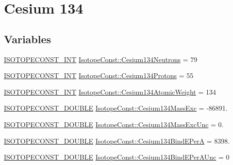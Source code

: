 \hypertarget{group___isotope_const-_cesium-_cs134}{}\section{Cesium 134}
\label{group___isotope_const-_cesium-_cs134}
\subsection*{Variables}
\begin{DoxyCompactItemize}
\item 
\mbox{\hyperlink{group___isotope_const-_macros_ga5f18360b3e99483a35c32d789e62621c}{I\+S\+O\+T\+O\+P\+E\+C\+O\+N\+S\+T\+\_\+\+I\+NT}} \mbox{\hyperlink{group___isotope_const-_cesium-_cs134_gae3ab79e8625c3c9ac06b12de8f676618}{Isotope\+Const\+::\+Cesium134\+Neutrons}} = 79
\item 
\mbox{\hyperlink{group___isotope_const-_macros_ga5f18360b3e99483a35c32d789e62621c}{I\+S\+O\+T\+O\+P\+E\+C\+O\+N\+S\+T\+\_\+\+I\+NT}} \mbox{\hyperlink{group___isotope_const-_cesium-_cs134_ga68cd92e999057d37fd5166431903fe27}{Isotope\+Const\+::\+Cesium134\+Protons}} = 55
\item 
\mbox{\hyperlink{group___isotope_const-_macros_ga5f18360b3e99483a35c32d789e62621c}{I\+S\+O\+T\+O\+P\+E\+C\+O\+N\+S\+T\+\_\+\+I\+NT}} \mbox{\hyperlink{group___isotope_const-_cesium-_cs134_gacf3323b03c77e6620b390180b1042083}{Isotope\+Const\+::\+Cesium134\+Atomic\+Weight}} = 134
\item 
\mbox{\hyperlink{group___isotope_const-_macros_ga8f45a7272ce02c0b4c65c44636ed719a}{I\+S\+O\+T\+O\+P\+E\+C\+O\+N\+S\+T\+\_\+\+D\+O\+U\+B\+LE}} \mbox{\hyperlink{group___isotope_const-_cesium-_cs134_ga63ff1f35519ee01f5b2b18b9ed2eb9fd}{Isotope\+Const\+::\+Cesium134\+Mass\+Exc}} = -\/86891.
\item 
\mbox{\hyperlink{group___isotope_const-_macros_ga8f45a7272ce02c0b4c65c44636ed719a}{I\+S\+O\+T\+O\+P\+E\+C\+O\+N\+S\+T\+\_\+\+D\+O\+U\+B\+LE}} \mbox{\hyperlink{group___isotope_const-_cesium-_cs134_ga35d1ebef00d0b43fac9aafa601194659}{Isotope\+Const\+::\+Cesium134\+Mass\+Exc\+Unc}} = 0.
\item 
\mbox{\hyperlink{group___isotope_const-_macros_ga8f45a7272ce02c0b4c65c44636ed719a}{I\+S\+O\+T\+O\+P\+E\+C\+O\+N\+S\+T\+\_\+\+D\+O\+U\+B\+LE}} \mbox{\hyperlink{group___isotope_const-_cesium-_cs134_ga2150e2973361649a71dc31d8871cae5b}{Isotope\+Const\+::\+Cesium134\+Bind\+E\+PerA}} = 8398.
\item 
\mbox{\hyperlink{group___isotope_const-_macros_ga8f45a7272ce02c0b4c65c44636ed719a}{I\+S\+O\+T\+O\+P\+E\+C\+O\+N\+S\+T\+\_\+\+D\+O\+U\+B\+LE}} \mbox{\hyperlink{group___isotope_const-_cesium-_cs134_ga1948b0006a93449433a82a44035b2c79}{Isotope\+Const\+::\+Cesium134\+Bind\+E\+Per\+A\+Unc}} = 0

\end{DoxyCompactItemize}
